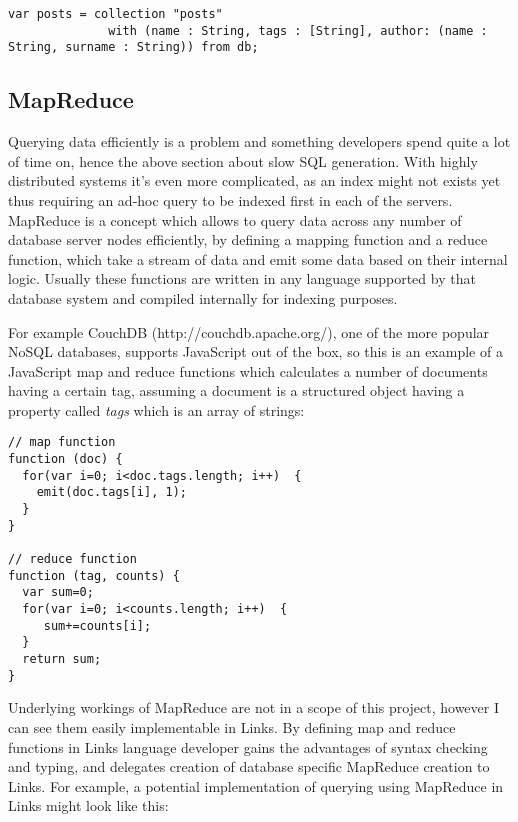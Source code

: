 \begin{codelisting}
\begin{verbatim}
var posts = collection "posts" 
			  with (name : String, tags : [String], author: (name : String, surname : String)) from db;
\end{verbatim}
\end{codelisting}

\subsection{MapReduce}

Querying data efficiently is a problem and something developers spend quite a lot of time on, hence the above section about slow SQL generation. With highly distributed systems it's even more complicated, as an index might not exists yet thus requiring an ad-hoc query to be indexed first in each of the servers. MapReduce\citep{map-reduce} is a concept which allows to query data across any number of database server nodes efficiently, by defining a mapping function and a reduce function, which take a stream of data and emit some data based on their internal logic. Usually these functions are written in any language supported by that database system and compiled internally for indexing purposes.

For example CouchDB (http://couchdb.apache.org/), one of the more popular NoSQL databases, supports JavaScript out of the box, so this is an example of a JavaScript map and reduce functions which calculates a number of documents having a certain tag, assuming a document is a structured object having a property called \textit{tags} which is an array of strings:

\begin{codelisting}
\begin{verbatim}
// map function
function (doc) { 
  for(var i=0; i<doc.tags.length; i++)  {
    emit(doc.tags[i], 1); 
  }
}

// reduce function
function (tag, counts) {
  var sum=0; 
  for(var i=0; i<counts.length; i++)  {
     sum+=counts[i];
  }
  return sum; 
}
\end{verbatim}
\end{codelisting}

Underlying workings of MapReduce are not in a scope of this project, however I can see them easily implementable in Links. By defining map and reduce functions in Links language developer gains the advantages of syntax checking and typing, and delegates creation of database specific MapReduce creation to Links. For example, a potential implementation of querying using MapReduce in Links might look like this:


